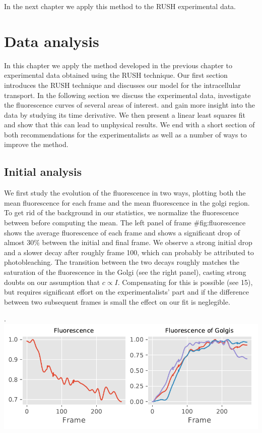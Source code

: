\documentclass{Dissertate}
\begin{document}
In the next chapter we apply this method to the RUSH experimental data.

\hypertarget{data-analysis}{%
\chapter{Data analysis}\label{data-analysis}}

In this chapter we apply the method developed in the previous chapter to
experimental data obtained using the RUSH technique. Our first section
introduces the RUSH technique and discusses our model for the
intracellular transport. In the following section we discuss the
experimental data, investigate the fluorescence curves of several areas
of interest. and gain more insight into the data by studying its time
derivative. We then present a linear least squares fit and show that
this can lead to unphysical results. We end with a short section of both
recommendations for the experimentalists as well as a number of ways to
improve the method.

\hypertarget{initial-analysis}{%
\section{Initial analysis}\label{initial-analysis}}

We first study the evolution of the fluorescence in two ways, plotting
both the mean fluorescence for each frame and the mean fluorescence in
the golgi region. To get rid of the background in our statistics, we
normalize the fluorescence between before computing the mean. The left
panel of frame \#fig:fluorescence shows the average fluorescence of each
frame and shows a significant drop of almost \(30\%\) between the
initial and final frame. We observe a strong initial drop and a slower
decay after roughly frame 100, which can probably be attributed to
photobleaching. The transition between the two decays roughly matches
the saturation of the fluorescence in the Golgi (see the right panel),
casting strong doubts on our assumption that \(c\propto I\).
Compensating for this is possible (see 15), but requires significant
effort on the experimentalists' part and if the difference between two
subsequent frames is small the effect on our fit is neglegible.

.\includegraphics{source/figures/pdf/general_fluorescence.pdf}
\end{document}
